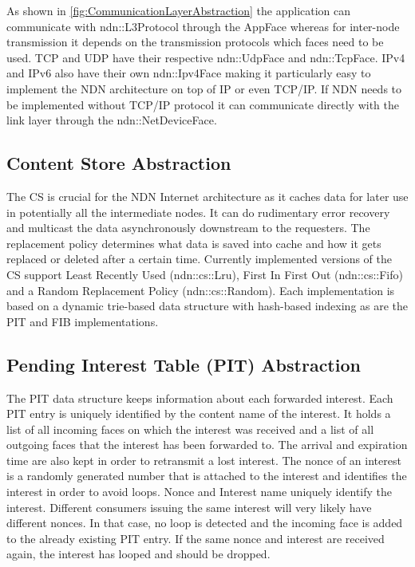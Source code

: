 As shown in \ref{fig:CommunicationLayerAbstraction} the application can communicate with ndn::L3Protocol through the AppFace whereas for inter-node transmission it depends on the transmission protocols which faces need to be used. TCP and UDP have their respective ndn::UdpFace and ndn::TcpFace. IPv4 and IPv6 also have their own ndn::Ipv4Face making it particularly easy to implement the NDN architecture on top of IP or even TCP/IP. If NDN needs to be implemented without TCP/IP protocol it can communicate directly with the link layer through the ndn::NetDeviceFace.

\subsection{Content Store Abstraction}

The CS is crucial for the NDN Internet architecture as it caches data for later use in potentially all the intermediate nodes. It can do rudimentary error recovery and multicast the data asynchronously downstream to the requesters. The replacement policy determines what data is saved into cache and how it gets replaced or deleted after a certain time. Currently implemented versions of the CS support Least Recently Used (ndn::cs::Lru), First In First Out (ndn::cs::Fifo) and a Random Replacement Policy (ndn::cs::Random). Each implementation is based on a dynamic trie-based data structure with hash-based indexing as are the PIT and FIB implementations.

\subsection{Pending Interest Table (PIT) Abstraction}

The PIT data structure keeps information about each forwarded interest. Each PIT entry is uniquely identified by the content name of the interest. It holds a list of all incoming faces on which the interest was received and a list of all outgoing faces that the interest has been forwarded to. The arrival and expiration time are also kept in order to retransmit a lost interest. The nonce of an interest is a randomly generated number that is attached to the interest and identifies the interest in order to avoid loops. Nonce and Interest name uniquely identify the interest. Different consumers issuing the same interest will very likely have different nonces. In that case, no loop is detected and the incoming face is added to the already existing PIT entry. If the same nonce and interest are received again, the interest has looped and should be dropped.

